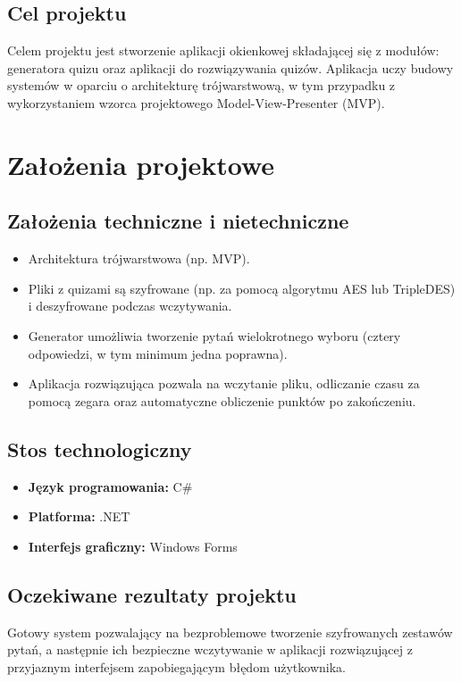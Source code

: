 \documentclass[12pt,a4paper]{article}
\begin{document}
\subsection{Cel projektu}
Celem projektu jest stworzenie aplikacji okienkowej składającej się z modułów: generatora quizu oraz aplikacji do rozwiązywania quizów. Aplikacja uczy budowy systemów w oparciu o architekturę trójwarstwową, w tym przypadku z wykorzystaniem wzorca projektowego Model-View-Presenter (MVP).

\section{Założenia projektowe}
\subsection{Założenia techniczne i nietechniczne}
\begin{itemize}
    \item Architektura trójwarstwowa (np. MVP).
    \item Pliki z quizami są szyfrowane (np. za pomocą algorytmu AES lub TripleDES) i deszyfrowane podczas wczytywania.
    \item Generator umożliwia tworzenie pytań wielokrotnego wyboru (cztery odpowiedzi, w tym minimum jedna poprawna).
    \item Aplikacja rozwiązująca pozwala na wczytanie pliku, odliczanie czasu za pomocą zegara oraz automatyczne obliczenie punktów po zakończeniu.
\end{itemize}

\subsection{Stos technologiczny}
\begin{itemize}
    \item \textbf{Język programowania:} C\#
    \item \textbf{Platforma:} .NET
    \item \textbf{Interfejs graficzny:} Windows Forms
\end{itemize}

\subsection{Oczekiwane rezultaty projektu}
Gotowy system pozwalający na bezproblemowe tworzenie szyfrowanych zestawów pytań, a następnie ich bezpieczne wczytywanie w aplikacji rozwiązującej z przyjaznym interfejsem zapobiegającym błędom użytkownika.
\end{document}
